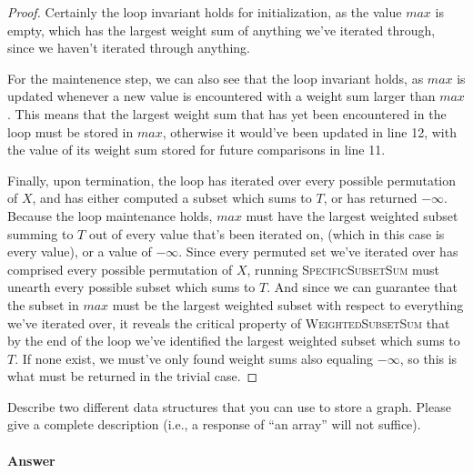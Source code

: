 \documentclass{article}
\begin{document}
\begin{enumerate}
\begin{proof}
			Certainly the loop invariant holds for initialization, as the value $max$ is empty, which has
			the largest weight sum of anything we've iterated through, since we haven't iterated through anything.

			For the maintenence step, we can also see that the loop invariant holds, as $max$ is updated whenever
			a new value is encountered with a weight sum larger than $max$. This means that the largest weight sum
			that has yet been encountered in the loop must be stored in $max$, otherwise it would've been updated in
			line 12, with the value of its weight sum stored for future comparisons in line 11.

			Finally, upon termination, the loop has iterated over every possible permutation of $X$, and has either
			computed a subset which sums to $T$, or has returned $-\infty$. Because the loop maintenance holds, $max$
			must have the largest weighted subset summing to $T$ out of every value 
			that's been iterated on, (which in this case is every value), or a value 
			of $-\infty$. Since every permuted set we've iterated over has comprised every possible permutation of $X$,
			running \textsc{SpecificSubsetSum} must unearth every possible subset which sums to $T$. And since we can guarantee
			that the subset in $max$ must be the largest weighted subset with respect to everything we've iterated over,
			it reveals the critical property of \textsc{WeightedSubsetSum} that by the end of the loop we've identified the
			largest weighted subset which sums to $T$. If none exist, we must've only found weight sums also equaling $-\infty$,
			so this is what must be returned in the trivial case.
		\end{proof}






\end{enumerate}




\nextprob
{}

Describe two different data structures that you can use to store a graph.
Please give a complete description (i.e., a response of ``an array'' will not
suffice).

\paragraph{Answer}

\end{document}
